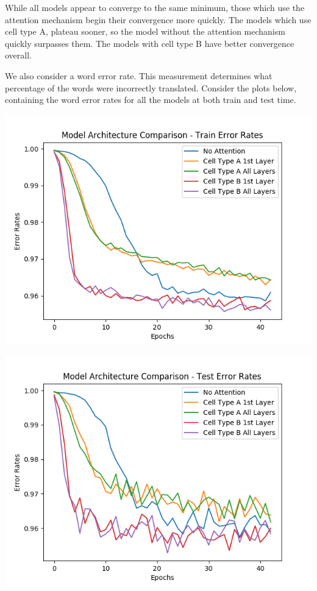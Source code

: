 \documentclass[letterpaper, 10pt]{article}
\begin{document}
\begin{multicols}{2}
\noindent While all models appear to converge to the same minimum, those which use the attention
mechanism begin their convergence more quickly.
The models which use cell type A, plateau sooner, so the model without the attention mechanism
quickly surpasses them.
The models with cell type B have better convergence overall.

We also consider a word error rate.
This measurement determines what percentage of the words were incorrectly translated.
Consider the plots below, containing the word error rates for all the models at both train and test
time.

\begin{center}
\includegraphics[scale=.4]{model_comparison_error_rates_train}
\end{center}

\begin{center}
\includegraphics[scale=.4]{model_comparison_error_rates_test}
\end{center}


\end{multicols}
\end{document}
